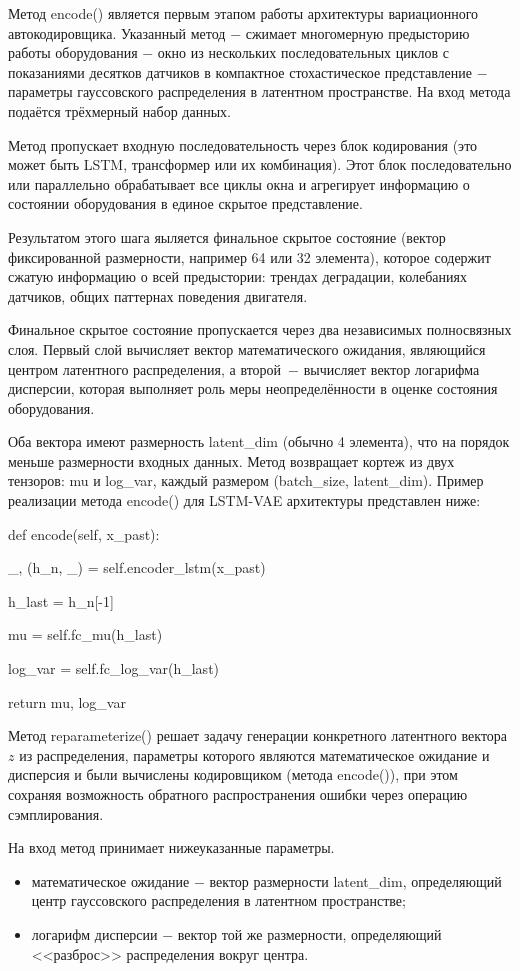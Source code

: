 \documentclass[14pt, a4paper, oneside]{extreport}
\begin{document}
Метод encode() является первым этапом работы архитектуры вариационного автокодировщика. Указанный метод $-$ сжимает многомерную предысторию работы оборудования $-$ окно из нескольких последовательных циклов с показаниями десятков датчиков в компактное стохастическое представление $-$ параметры гауссовского распределения в латентном пространстве. На вход метода подаётся трёхмерный набор данных. 

Метод пропускает входную последовательность через блок кодирования (это может быть LSTM, трансформер или их комбинация). Этот блок последовательно или параллельно обрабатывает все циклы окна и агрегирует информацию о состоянии оборудования в единое скрытое представление.

Результатом этого шага яыляется финальное скрытое состояние (вектор фиксированной размерности, например 64 или 32 элемента), которое содержит сжатую информацию о всей предыстории: трендах деградации, колебаниях датчиков, общих паттернах поведения двигателя.

Финальное скрытое состояние пропускается через два независимых полносвязных слоя.
Первый слой вычисляет вектор математического ожидания, являющийся центром латентного распределения, а второй~$-$ вычисляет вектор логарифма дисперсии, которая выполняет роль меры неопределённости в оценке состояния оборудования.

Оба вектора имеют размерность {latent\_dim} (обычно 4 элемента), что на порядок меньше размерности входных данных. Метод возвращает кортеж из двух тензоров: mu и {log\_var}, каждый размером ({batch\_size}, {latent\_dim}).
Пример реализации метода encode() для LSTM-VAE архитектуры представлен ниже:

def encode(self, x\_past):

\_, (h\_n, \_) = self.encoder\_lstm(x\_past)

h\_last = h\_n[-1] 

mu = self.fc\_mu(h\_last)

log\_var = self.fc\_log\_var(h\_last)

return mu, log\_var

Метод reparameterize() решает задачу генерации конкретного латентного вектора $z$ из распределения, параметры которого являются математическое ожидание и дисперсия и были вычислены кодировщиком (метода encode()), при этом сохраняя возможность обратного распространения ошибки через операцию сэмплирования.

На вход метод принимает нижеуказанные параметры.
\begin{itemize}
    \item математическое ожидание $-$ вектор размерности latent\_dim, определяющий центр гауссовского распределения в латентном пространстве;
    \item логарифм дисперсии $-$ вектор той же размерности, определяющий <<разброс>> распределения вокруг центра.
\end{itemize}
\end{document}

